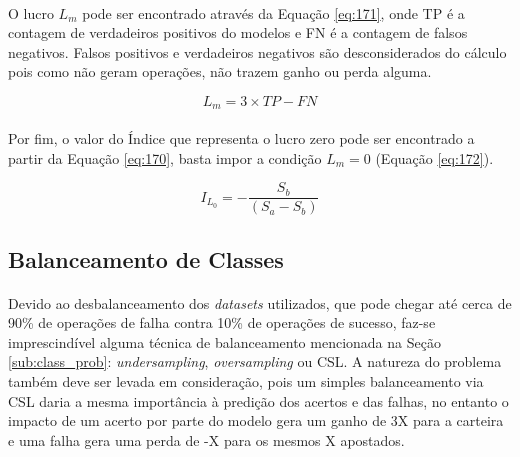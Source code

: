 \paragraph{} O lucro \begin{math} L_m \end{math} pode ser encontrado através da Equação \ref{eq:171}, onde TP é a contagem de verdadeiros positivos do modelos e FN é a contagem de falsos negativos. Falsos positivos e verdadeiros negativos são desconsiderados do cálculo pois como não geram operações, não trazem ganho ou perda alguma.

\begin{equation} \label{eq:171}
    L_m = 3 \times TP - FN
\end{equation}

\paragraph{} Por fim, o valor do Índice que representa o lucro zero pode ser encontrado a partir da Equação \ref{eq:170}, basta impor a condição \begin{math} L_m=0 \end{math} (Equação \ref{eq:172}).

\begin{equation} \label{eq:172}
    I_{L_0} = - \dfrac{S_b}{(S_a - S_b)}
\end{equation}



\FloatBarrier
\subsection{Balanceamento de Classes}

\paragraph{} Devido ao desbalanceamento dos \textit{datasets} utilizados, que pode chegar até cerca de 90\% de operações de falha contra 10\% de operações de sucesso, faz-se imprescindível alguma técnica de balanceamento mencionada na Seção \ref{sub:class_prob}: \textit{undersampling}, \textit{oversampling} ou CSL. A natureza do problema também deve ser levada em consideração, pois um simples balanceamento via CSL daria a mesma importância à predição dos acertos e das falhas, no entanto o impacto de um acerto por parte do modelo gera um ganho de 3X para a carteira e uma falha gera uma perda de -X para os mesmos X apostados.

